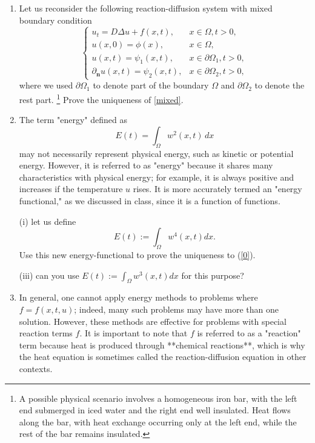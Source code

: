 \documentclass[6pt]{article}
\numberwithin{equation}{section}
\begin{document}
\begin{enumerate}
(i)  prove the uniqueness of (\ref{1}) when $\alpha=0$ and $\beta\neq 0$;

(ii) prove the uniqueness when both $\alpha$ and $\beta$ are not zero.  You might need to discuss the signs of $\alpha$ and $\beta$.


\item Let us reconsider the following reaction-diffusion system with mixed boundary condition
\begin{equation}\label{mixed}
\left\{
\begin{array}{ll}
u_t=D\Delta u+f(x,t),&x\in \Omega,t>0,\\
u(x,0)=\phi(x),&x\in \Omega,\\
u(x,t)=\psi_1(x,t),&x \in \partial \Omega_1, t>0,\\
\partial_\textbf{n}u(x,t)=\psi_2(x,t),&x \in \partial \Omega_2, t>0,
\end{array}
\right.
\end{equation} 
where we used $\partial\Omega_1$ to denote part of the boundary $\Omega$ and $\partial\Omega_2$ to denote the rest part. \footnote{A possible physical scenario involves a homogeneous iron bar, with the left end submerged in iced water and the right end well insulated. Heat flows along the bar, with heat exchange occurring only at the left end, while the rest of the bar remains insulated.}
Prove the uniqueness of \eqref{mixed}.

\item   
The term "energy" defined as 
\[ E(t) = \int_\Omega w^2(x, t) \, dx \] 
may not necessarily represent physical energy, such as kinetic or potential energy. However, it is referred to as "energy" because it shares many characteristics with physical energy; for example, it is always positive and increases if the temperature \( u \) rises. It is more accurately termed an "energy functional," as we discussed in class, since it is a function of functions.

(i) let us define
\[E(t):=\int_\Omega w^4(x,t)dx.\]
Use this new energy-functional to prove the uniqueness to (\ref{0}).

(iii)  can you use $E(t):=\int_\Omega w^3(x,t)dx$ for this purpose? 


\item In general, one cannot apply energy methods to problems where \( f = f(x, t, u) \); indeed, many such problems may have more than one solution. However, these methods are effective for problems with special reaction terms \( f \). It is important to note that \( f \) is referred to as a "reaction" term because heat is produced through **chemical reactions**, which is why the heat equation is sometimes called the reaction-diffusion equation in other contexts.


\end{enumerate}
\end{document}
